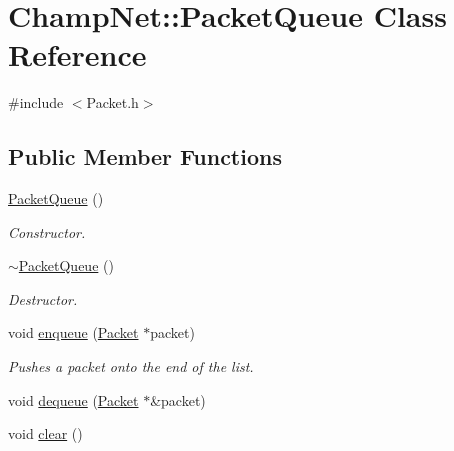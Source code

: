 \hypertarget{class_champ_net_1_1_packet_queue}{\section{Champ\-Net\-:\-:Packet\-Queue Class Reference}
\label{class_champ_net_1_1_packet_queue}
}


{\ttfamily \#include $<$Packet.\-h$>$}

\subsection*{Public Member Functions}
\begin{DoxyCompactItemize}
\item 
\hypertarget{class_champ_net_1_1_packet_queue_a26d8e8206649764d5c6a947ae90b17b8}{\hyperlink{class_champ_net_1_1_packet_queue_a26d8e8206649764d5c6a947ae90b17b8}{Packet\-Queue} ()}\label{class_champ_net_1_1_packet_queue_a26d8e8206649764d5c6a947ae90b17b8}

\begin{DoxyCompactList}\small\item\em Constructor. \end{DoxyCompactList}\item 
\hypertarget{class_champ_net_1_1_packet_queue_ace2be8c7f79db8eef199b17fff57aecf}{\hyperlink{class_champ_net_1_1_packet_queue_ace2be8c7f79db8eef199b17fff57aecf}{$\sim$\-Packet\-Queue} ()}\label{class_champ_net_1_1_packet_queue_ace2be8c7f79db8eef199b17fff57aecf}

\begin{DoxyCompactList}\small\item\em Destructor. \end{DoxyCompactList}\item 
\hypertarget{class_champ_net_1_1_packet_queue_ad78fb4bda594d1941de0d0b97cb17c8f}{void \hyperlink{class_champ_net_1_1_packet_queue_ad78fb4bda594d1941de0d0b97cb17c8f}{enqueue} (\hyperlink{class_champ_net_1_1_packet}{Packet} $\ast$packet)}\label{class_champ_net_1_1_packet_queue_ad78fb4bda594d1941de0d0b97cb17c8f}

\begin{DoxyCompactList}\small\item\em Pushes a packet onto the end of the list. \end{DoxyCompactList}\item 
void \hyperlink{class_champ_net_1_1_packet_queue_a775c0b091e646b35b24abd60ed8003e9}{dequeue} (\hyperlink{class_champ_net_1_1_packet}{Packet} $\ast$\&packet)
\item 
\hypertarget{class_champ_net_1_1_packet_queue_a58fb470b0b4a6678495c36e89a7d4f58}{void \hyperlink{class_champ_net_1_1_packet_queue_a58fb470b0b4a6678495c36e89a7d4f58}{clear} ()}\label{class_champ_net_1_1_packet_queue_a58fb470b0b4a6678495c36e89a7d4f58}


\end{DoxyCompactItemize}
